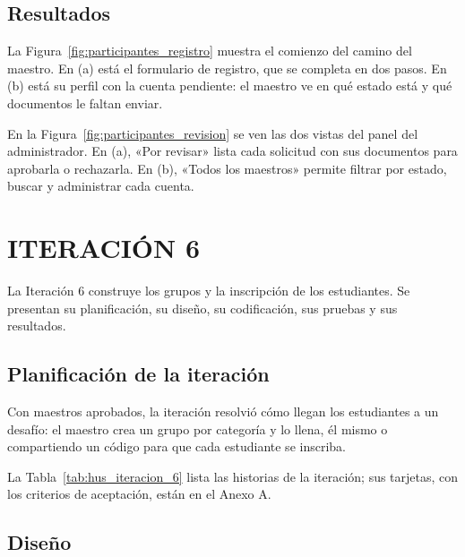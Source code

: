 \subsection{Resultados}

La Figura~\ref{fig:participantes_registro} muestra el comienzo del camino del maestro. En (a) está el formulario de registro, que se completa en dos pasos. En (b) está su perfil con la cuenta pendiente: el maestro ve en qué estado está y qué documentos le faltan enviar.


En la Figura~\ref{fig:participantes_revision} se ven las dos vistas del panel del administrador. En (a), «Por revisar» lista cada solicitud con sus documentos para aprobarla o rechazarla. En (b), «Todos los maestros» permite filtrar por estado, buscar y administrar cada cuenta.


\section{ITERACIÓN 6}

La Iteración 6 construye los grupos y la inscripción de los estudiantes. Se presentan su planificación, su diseño, su codificación, sus pruebas y sus resultados.

\subsection{Planificación de la iteración}

Con maestros aprobados, la iteración resolvió cómo llegan los estudiantes a un desafío: el maestro crea un grupo por categoría y lo llena, él mismo o compartiendo un código para que cada estudiante se inscriba.

La Tabla~\ref{tab:hus_iteracion_6} lista las historias de la iteración; sus tarjetas, con los criterios de aceptación, están en el Anexo A.



\subsection{Diseño}

